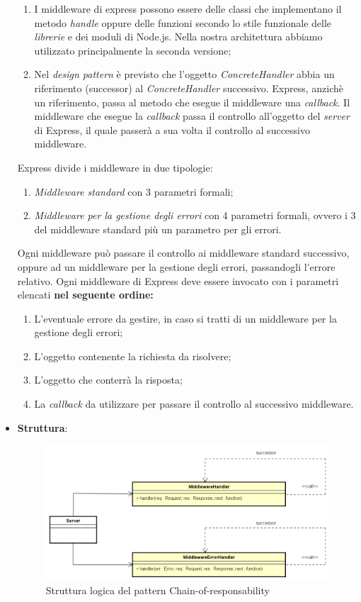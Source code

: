 \begin{itemize}
	\begin{enumerate}
		\item I middleware di express possono essere delle classi che implementano il metodo \textit{handle} oppure delle funzioni secondo lo stile funzionale delle \textit{librerie} e dei moduli di Node.js. Nella nostra architettura abbiamo utilizzato principalmente la seconda versione;
		\item Nel \textit{design pattern} è previsto che l'oggetto \textit{ConcreteHandler} abbia un riferimento (successor) al \textit{ConcreteHandler} successivo. Express, anzichè un riferimento, passa al metodo che esegue il middleware una \textit{callback}. Il middleware che esegue la \textit{callback} passa il controllo all'oggetto del \textit{server} di Express, il quale passerà a sua volta il controllo al successivo middleware.
	\end{enumerate}
Express divide i middleware in due tipologie:
	\begin{enumerate}
		\item \textit{Middleware standard} con 3 parametri formali;
		\item \textit{Middleware per la gestione degli errori} con 4 parametri formali, ovvero i 3 del middleware standard più un parametro per gli errori.
	\end{enumerate}
Ogni middleware può passare il controllo ai middleware standard successivo, oppure ad un middleware per la gestione degli errori, passandogli l'errore relativo. Ogni middleware di Express deve essere invocato con i parametri elencati \textbf{nel seguente ordine:}
	\begin{enumerate}
		\item L'eventuale errore da gestire, in caso si tratti di un middleware per la gestione degli errori;
		\item L'oggetto contenente la richiesta da risolvere;
		\item L'oggetto che conterrà la risposta;
		\item La \textit{callback} da utilizzare per passare il controllo al successivo middleware.
	\end{enumerate}

\item \textbf{Struttura}:
\label{Struttura logica del pattern Chain-of-responsability}
\begin{figure} [ht]
	\centering
	\includegraphics[scale=0.50]{UML/strutturaPattern/Chain-of-responsability.png}
	\caption{Struttura logica del pattern Chain-of-responsability}
\end{figure}


\end{itemize}
